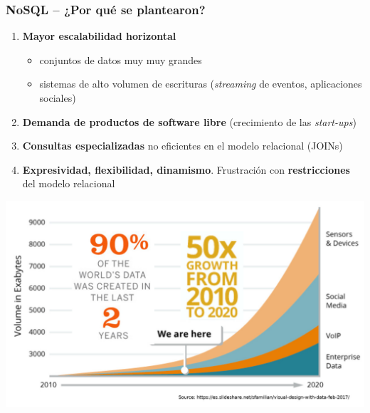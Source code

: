 \begin{frame}[allowframebreaks]
  \frametitle{NoSQL -- ¿Por qué se plantearon?}
\begin{enumerate}
\item {\bf Mayor escalabilidad horizontal}
  \begin{itemize}
  \item conjuntos de datos muy muy grandes
  \item sistemas de alto volumen de escrituras ({\em streaming\/} de
    eventos, aplicaciones sociales)
  \end{itemize}
\item {\bf Demanda de productos de software libre} (crecimiento de las {\em
    start-ups})
\item {\bf Consultas especializadas} no eficientes en el modelo relacional
  (JOINs)
\item {\bf Expresividad, flexibilidad, dinamismo}. Frustración con {\bf
    restricciones} del modelo relacional
\end{enumerate}

\framebreak

\includegraphics[width=\textwidth]{img/data-growth}

\end{frame}


